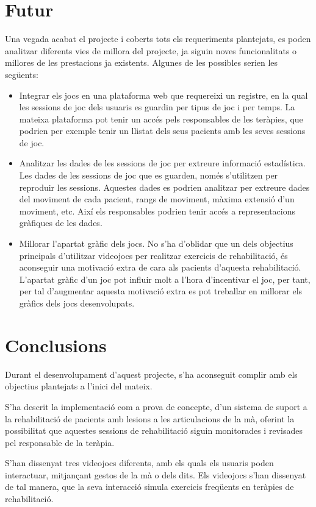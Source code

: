\documentclass[12pt,a4paper,catalan]{article}
\begin{document}
	\section{Futur}
	Una vegada acabat el projecte i coberts tots els requeriments plantejats, es poden analitzar diferents vies de millora del projecte, ja siguin noves funcionalitats o millores de les prestacions ja existents. Algunes de les possibles serien les següents:
	\begin{itemize}
		\item Integrar els jocs en una plataforma web que requereixi un registre, en la qual les sessions de joc dels usuaris es guardin per tipus de joc i per temps. La mateixa plataforma pot tenir un accés pels responsables de les teràpies, que podrien per exemple tenir un llistat dels seus pacients amb les seves sessions de joc.
		\item Analitzar les dades de les sessions de joc per extreure informació estadística. Les dades de les sessions de joc que es guarden, només s'utilitzen per reproduir les sessions. Aquestes dades es podrien analitzar per extreure dades del moviment de cada pacient, rangs de moviment, màxima extensió d'un moviment, etc. Així els responsables podrien tenir accés a representacions gràfiques de les dades.
		\item Millorar l'apartat gràfic dels jocs. No s'ha d'oblidar que un dels objectius principals d'utilitzar videojocs per realitzar exercicis de rehabilitació, és aconseguir una motivació extra de cara als pacients d'aquesta rehabilitació. L'apartat gràfic d'un joc pot influir molt a l'hora d'incentivar el joc, per tant, per tal d'augmentar aquesta motivació extra es pot treballar en millorar els gràfics dels jocs desenvolupats.
	\end{itemize}
	\section{Conclusions}
	Durant el desenvolupament d'aquest projecte, s'ha aconseguit complir amb els objectius plantejats a l'inici del mateix.
	
	S'ha descrit la implementació com a prova de concepte, d'un sistema de suport a la rehabilitació de pacients amb lesions a les articulacions de la mà, oferint la possibilitat que aquestes sessions de rehabilitació siguin monitorades i revisades pel responsable de la teràpia.
	
	S'han dissenyat tres videojocs diferents, amb els quals els usuaris poden interactuar, mitjançant gestos de la mà o dels dits. Els videojocs s'han dissenyat de tal manera, que la seva interacció simula exercicis freqüents en teràpies de rehabilitació.
	
\end{document}
